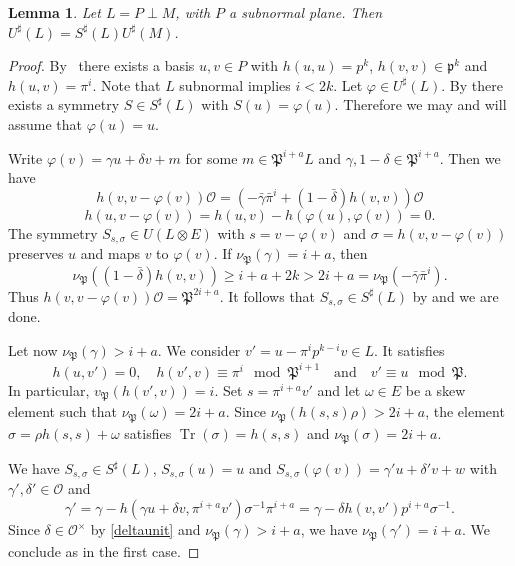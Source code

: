 \documentclass[a4paper]{amsart}
\theoremstyle{definition}
\theoremstyle{plain}
\newtheorem{lemma}[definition]{Lemma}
\DeclareMathOperator{\Tr}{Tr}
\renewcommand{\O}{\mathcal{O}}
\newcommand{\fp}{\mathfrak{p}}
\newcommand{\FP}{\mathfrak{P}}
\newcommand{\sprod}[2]{h( #1, #2)}
\newcommand{\sprodq}[2]{h( #1,#1)}
\begin{document}
\begin{lemma}\label{plane}
  Let $L =  P \perp M$, with $P$ a subnormal plane.
%
  Then $U^\sharp(L) = S^\sharp(L)U^\sharp(M)$.
\end{lemma}
\begin{proof}
%
%
%
%
%
%
%
%
%
%
%
%
%
%
%
%


%
%
%
%
%
%
%
%
%
%
%
%
%
%
%
%
%
%
%
%
%
%
%
%
%
%
%
%
%
%
%
  By~\cite{Jacobowitz1962} there exists a basis $u, v \in P$ with $\sprodq{u}{u} = p^k$, $\sprodq{v}{v}\in \fp^{k}$ and
  $\sprod{u}{v}=\pi^i$. Note that $L$ subnormal implies $i<2k$. Let $\varphi \in U^\sharp(L)$.
  By  there exists a symmetry $S \in S^\sharp(L)$ with $S(u) = \varphi(u)$. Therefore we may and will assume that $\varphi(u) = u$.

  Write $\varphi(v) = \gamma u + \delta v + m$ for some $m \in \FP^{i+a}L$ and $\gamma,1-\delta \in \FP^{i+a}$.
  Then we have
  \[\sprod{v}{v-\varphi(v)}\O=(-\bar \gamma \bar \pi^i+(1-\bar\delta)\sprodq{v}{v})\O\]
  \begin{equation}\label{deltaunit}
    \sprod{u}{v-\varphi(v)} = \sprod{u}{v}-\sprod{\varphi(u)}{\varphi(v)} = 0.
  \end{equation}
  The symmetry $S_{s,\sigma} \in U(L\otimes E)$ with $s=v - \varphi(v)$ and $\sigma = \sprod{v}{v-\varphi(v)}$ preserves $u$ and maps $v$ to $\varphi(v)$.
  If $\nu_\FP(\gamma) = i+a$, then
  \[ \nu_\FP((1 - \bar \delta)\sprodq v v)  \geq i + a + 2k > 2i + a = \nu_\FP(-\bar \gamma \bar \pi^i). \]
  Thus $\sprod{v}{v-\varphi(v)}\O = \FP^{2i+a}$.
  It follows that $S_{s,\sigma} \in S^\sharp(L)$ by  and we are done.


  Let now $\nu_\FP(\gamma)> i +a$. We
  consider $v' = u - \pi^i p^{k-i}v \in L$. It satisfies
  \[\sprod u {v'} = 0, \quad \sprod{v'}{v}\equiv \pi^i \mod \FP^{i+1} \quad \text{and} \quad v' \equiv u \mod \FP.\]
  In particular, $v_\FP(\sprod {v'}v) = i$.
  Set $s = \pi^{i+a}v'$ and let $\omega\in E$ be a skew element such that $\nu_\FP(\omega) = 2i + a$.
  Since $\nu_\FP(\sprodq{s}{s} \rho) %
  > 2i+a$, the element $\sigma = \rho \sprodq{s}{s} + \omega$ satisfies $\Tr(\sigma) = \sprodq{s}{s}$ and
  $\nu_\FP(\sigma) = 2i + a$.

  We have $S_{s,\sigma} \in S^\sharp(L)$,
  $S_{s,\sigma}(u) = u$ and $S_{s,\sigma}(\varphi(v)) = \gamma' u + \delta' v + w$
  with $\gamma',\delta' \in \O$ and
  \[\gamma' = \gamma - \sprod{\gamma u + \delta v}{\pi^{i+a}v'}\sigma^{-1} \pi^{i+a}
  = \gamma - \delta \sprod{v}{v'} p^{i+a}\sigma^{-1}.\]
  Since $\delta \in \O^\times$ by \cref{deltaunit} and $\nu_\FP(\gamma)>i+a$, we have
  $\nu_\FP(\gamma') = i+a$. We conclude as in the first case.
\end{proof}
\end{document}
